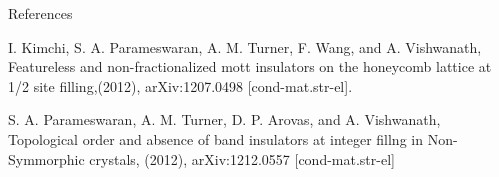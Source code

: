\begin{block}{References}
\small{\begin{thebibliography}{99}

 I. Kimchi, S. A. Parameswaran, A. M. Turner, F. Wang,
and A. Vishwanath, Featureless and non-fractionalized
mott insulators on the honeycomb lattice at 1/2 site filling,(2012), arXiv:1207.0498 [cond-mat.str-el].

 S. A. Parameswaran, A. M. Turner, D. P. Arovas, and
A. Vishwanath, Topological order and absence of band insulators at integer fillng in Non-Symmorphic crystals,
(2012), arXiv:1212.0557 [cond-mat.str-el]

\end{thebibliography}}
\vspace{0.75in}
\end{block}